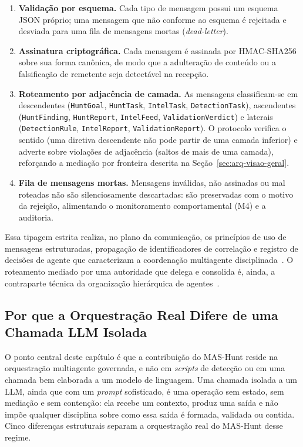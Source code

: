 \begin{enumerate}
  \item \textbf{Validação por esquema.} Cada tipo de mensagem possui um
    esquema JSON próprio; uma mensagem que não conforme ao esquema é rejeitada e
    desviada para uma fila de mensagens mortas (\emph{dead-letter}).
  \item \textbf{Assinatura criptográfica.} Cada mensagem é assinada por
    HMAC-SHA256 sobre sua forma canônica, de modo que a adulteração de conteúdo ou
    a falsificação de remetente seja detectável na recepção.
  \item \textbf{Roteamento por adjacência de camada.} As mensagens classificam-se
    em descendentes (\texttt{HuntGoal}, \texttt{HuntTask}, \texttt{IntelTask},
    \texttt{DetectionTask}), ascendentes (\texttt{HuntFinding}, \texttt{HuntReport},
    \texttt{IntelFeed}, \texttt{ValidationVerdict}) e laterais
    (\texttt{DetectionRule}, \texttt{IntelReport}, \texttt{ValidationReport}). O
    protocolo verifica o sentido (uma diretiva descendente não pode partir de uma
    camada inferior) e adverte sobre violações de adjacência (saltos de mais de uma
    camada), reforçando a mediação por fronteira descrita na
    Seção~\ref{sec:arq-visao-geral}.
  \item \textbf{Fila de mensagens mortas.} Mensagens inválidas, não assinadas ou
    mal roteadas não são silenciosamente descartadas: são preservadas com o motivo
    da rejeição, alimentando o monitoramento comportamental (M4) e a auditoria.
\end{enumerate}

Essa tipagem estrita realiza, no plano da comunicação, os princípios de uso de
mensagens estruturadas, propagação de identificadores de correlação e registro de
decisões de agente que caracterizam a coordenação multiagente
disciplinada~\cite{qiu2024collaborativeintelligencepropagatingintentions}. O
roteamento mediado por uma autoridade que delega e consolida é, ainda, a
contraparte técnica da organização hierárquica de
agentes~\cite{liu2023llm}.

\subsection{Por que a Orquestração Real Difere de uma Chamada LLM Isolada}
\label{sec:arq-difere}

O ponto central deste capítulo é que a contribuição do MAS-Hunt reside na
orquestração multiagente governada, e não em \emph{scripts} de detecção ou em uma
chamada bem elaborada a um modelo de linguagem. Uma chamada isolada a um LLM,
ainda que com um \emph{prompt} sofisticado, é uma operação sem estado, sem
mediação e sem contenção: ela recebe um contexto, produz uma saída e não impõe
qualquer disciplina sobre como essa saída é formada, validada ou contida. Cinco
diferenças estruturais separam a orquestração real do MAS-Hunt desse regime.

